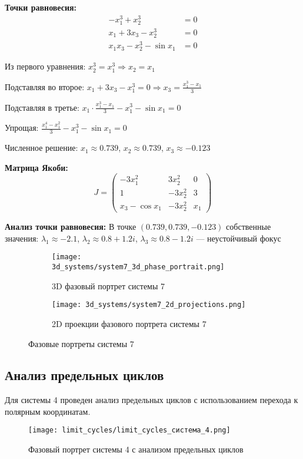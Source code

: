 \textbf{Точки равновесия:}
\begin{align}
-x_1^3 + x_2^3 &= 0 \\
x_1 + 3x_3 - x_2^3 &= 0 \\
x_1 x_3 - x_2^3 - \sin x_1 &= 0
\end{align}

Из первого уравнения: $x_2^3 = x_1^3 \Rightarrow x_2 = x_1$

Подставляя во второе: $x_1 + 3x_3 - x_1^3 = 0 \Rightarrow x_3 = \frac{x_1^3 - x_1}{3}$

Подставляя в третье: $x_1 \cdot \frac{x_1^3 - x_1}{3} - x_1^3 - \sin x_1 = 0$

Упрощая: $\frac{x_1^4 - x_1^2}{3} - x_1^3 - \sin x_1 = 0$

Численное решение: $x_1 \approx 0.739$, $x_2 \approx 0.739$, $x_3 \approx -0.123$

\textbf{Матрица Якоби:}
$$J = \begin{pmatrix} 
-3x_1^2 & 3x_2^2 & 0 \\
1 & -3x_2^2 & 3 \\
x_3 - \cos x_1 & -3x_2^2 & x_1
\end{pmatrix}$$

\textbf{Анализ точки равновесия:}
В точке $(0.739, 0.739, -0.123)$ собственные значения:
$\lambda_1 \approx -2.1$, $\lambda_2 \approx 0.8 + 1.2i$, $\lambda_3 \approx 0.8 - 1.2i$ --- неустойчивый фокус

\begin{figure}[H]
\centering
\begin{subfigure}[b]{0.49\textwidth}
\centering
\texttt{[image: 3d\_systems/system7\_3d\_phase\_portrait.png]}
\caption{3D фазовый портрет системы 7}
\label{fig:system7_3d}
\end{subfigure}
\hfill
\begin{subfigure}[b]{0.49\textwidth}
\centering
\texttt{[image: 3d\_systems/system7\_2d\_projections.png]}
\caption{2D проекции фазового портрета системы 7}
\label{fig:system7_2d}
\end{subfigure}
\caption{Фазовые портреты системы 7}
\end{figure}

\subsection*{Анализ предельных циклов}

Для системы 4 проведен анализ предельных циклов с использованием перехода к полярным координатам.


\begin{figure}[H]
\centering
\texttt{[image: limit\_cycles/limit\_cycles\_система\_4.png]}
\caption{Фазовый портрет системы 4 с анализом предельных циклов}
\label{fig:limit_cycles_system4}
\end{figure}
